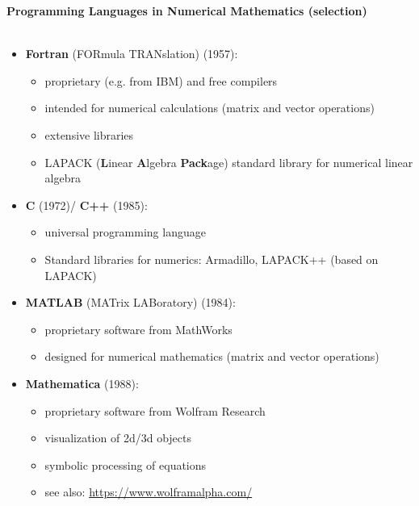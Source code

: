 \begin{frame}[c]
\textbf{\large Programming Languages in Numerical Mathematics (selection)}\\~\\
\begin{itemize}
	\item
	\textbf{Fortran} (FORmula TRANslation) (1957):
	
	\begin{itemize}
		
		\item
		proprietary (e.g. from IBM) and free compilers
		\item
		intended for numerical calculations (matrix and vector operations)
		\item
		extensive libraries
		\item
		LAPACK (\textbf{L}inear \textbf{A}lgebra \textbf{Pack}age) standard
		library for numerical linear algebra
	\end{itemize}
\end{itemize}
\begin{itemize}
	\item
	\textbf{C} (1972)/ \textbf{C++} (1985):
	\begin{itemize}
		
		\item
		universal programming language
		\item
		Standard libraries for numerics: Armadillo, LAPACK++ (based on
		LAPACK)
	\end{itemize}
\end{itemize}
%
\begin{itemize}
	
	\item
	\textbf{MATLAB} (MATrix LABoratory) (1984):
	
	\begin{itemize}
		
		\item
		proprietary software from MathWorks
		\item
		designed for numerical mathematics (matrix and vector operations)
	\end{itemize}
\end{itemize}
%
\begin{itemize}
	\item
	\textbf{Mathematica} (1988):
	\begin{itemize}
		
		\item
		proprietary software from Wolfram Research
		\item
		visualization of 2d/3d objects
		\item
		symbolic processing of equations
		\item
		see also: \url{https://www.wolframalpha.com/}
	\end{itemize}
\end{itemize}


\end{frame}
